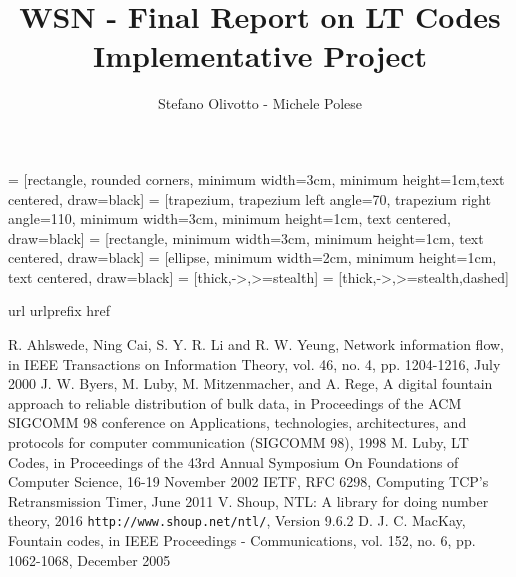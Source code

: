 \documentclass[12pt]{article}
\begin{document}
\title{WSN - Final Report on LT Codes Implementative Project}
\author{Stefano Olivotto - Michele Polese}
\maketitle

 = [rectangle, rounded corners, minimum width=3cm, minimum height=1cm,text centered, draw=black]
 = [trapezium, trapezium left angle=70, trapezium right angle=110, minimum width=3cm, minimum height=1cm, text centered, draw=black]
 = [rectangle, minimum width=3cm, minimum height=1cm, text centered, draw=black]
 = [ellipse, minimum width=2cm, minimum height=1cm, text centered, draw=black]
 = [thick,->,>=stealth]
 = [thick,->,>=stealth,dashed]








\begin{thebibliography}{10}
\expandafter\ifx\csname url\endcsname\relax
  \def\url#1{\texttt{#1}}\fi
\expandafter\ifx\csname urlprefix\endcsname\relax\def\urlprefix{URL }\fi
\expandafter\ifx\csname href\endcsname\relax
  \def\href#1#2{#2} \def\path#1{#1}\fi
  

  R. Ahlswede, Ning Cai, S. Y. R. Li and R. W. Yeung, Network information flow, in IEEE Transactions on Information Theory, vol. 46, no. 4, pp. 1204-1216, July 2000
 J. W. Byers, M. Luby, M. Mitzenmacher, and A. Rege, A digital fountain approach to reliable distribution of bulk data, in Proceedings of the ACM SIGCOMM 98 conference on Applications, technologies, architectures, and protocols for computer communication (SIGCOMM 98), 1998 
 M. Luby, LT Codes, in Proceedings of the 43rd Annual Symposium On Foundations of Computer Science, 16-19 November 2002
 IETF, RFC 6298, Computing TCP's Retransmission Timer, June 2011
 V. Shoup, NTL: A library for doing number theory, 2016 \url{http://www.shoup.net/ntl/}, Version 9.6.2
 D. J. C. MacKay, Fountain codes, in IEEE Proceedings - Communications, vol. 152, no. 6, pp. 1062-1068, December 2005
\end{thebibliography}
\end{document}
